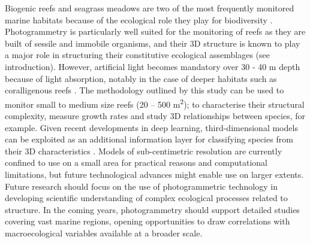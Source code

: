Biogenic reefs and seagrass meadows are two of the most frequently monitored marine habitats because of the ecological role they play for biodiversity \citep{ballesteros_mediterranean_2006, boudouresque_protection_2012, coker_importance_2014}. Photogrammetry is particularly well suited for the monitoring of reefs as they are built of sessile and immobile organisms, and their 3D structure is known to play a major role in structuring their constitutive ecological assemblages (see introduction). However, artificial light becomes mandatory over 30 - 40 m depth because of light absorption, notably in the case of deeper habitats such as coralligenous reefs \citep{ballesteros_mediterranean_2006}. The methodology outlined by this study can be used to monitor small to medium size reefs (20 – 500 m\textsuperscript{2}); to characterise their structural complexity, measure growth rates and study 3D relationships between species, for example. Given recent developments in deep learning, third-dimensional models can be exploited as an additional information layer for classifying species from their 3D characteristics \citep{maturana_voxnet:_2015, qi_pointnet:_2016}. Models of sub-centimetric resolution are currently confined to use on a small area for practical reasons and computational limitations, but future technological advances might enable use on larger extents. Future research should focus on the use of photogrammetric technology in developing scientific understanding of complex ecological processes related to structure. In the coming years, photogrammetry should support detailed studies covering vast marine regions, opening opportunities to draw correlations with macroecological variables available at a broader scale.


